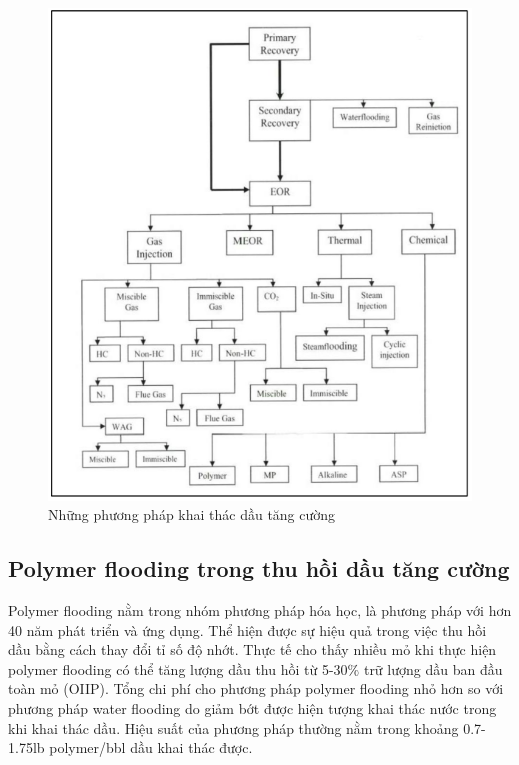 \documentclass[12pt,a4paper]{article}
\begin{document}
	\begin{figure}[h]
		\centering
		\includegraphics[scale=.7]{Fig/method.PNG}
		\caption{Những phương pháp khai thác dầu tăng cường \cite{doghaish2008analysis}}
	\end{figure}
	\subsection{Polymer flooding trong thu hồi dầu tăng cường}
	Polymer flooding nằm trong nhóm phương pháp hóa học, là phương pháp với hơn 40 năm phát triển và ứng dụng. Thể hiện được sự hiệu quả trong việc thu hồi dầu bằng cách thay đổi tỉ số độ nhớt. Thực tế cho thấy nhiều mỏ khi thực hiện polymer flooding có thể tăng lượng dầu thu hồi từ 5-30$\%$ \cite{abidin2012polymers} trữ lượng dầu ban đầu toàn mỏ (OIIP). Tổng chi phí cho phương pháp polymer flooding nhỏ hơn so với phương pháp water flooding do giảm bớt được hiện tượng khai thác nước trong khi khai thác dầu. Hiệu suất của phương pháp thường nằm trong khoảng 0.7-1.75lb polymer/bbl \cite{pope2007overview} dầu khai thác được.
\end{document}

